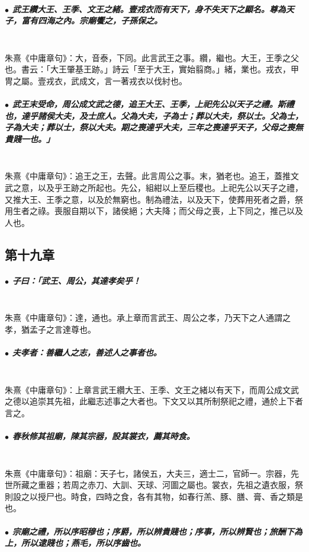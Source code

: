 \documentclass[hyperref, UTF8, 12pt, a4paper]{ctexrep}
\begin{document}
\subparagraph{$\bullet$ 武王纘大王、王季、文王之緒。壹戎衣而有天下，身不失天下之顯名。尊為天子，富有四海之內。宗廟饗之，子孫保之。} ~\\

朱熹《中庸章句》：大，音泰，下同。此言武王之事。纘，繼也。大王，王季之父也。書云：「大王肇基王跡。」詩云「至于大王，實始翦商。」緒，業也。戎衣，甲冑之屬。壹戎衣，武成文，言一著戎衣以伐紂也。

\subparagraph{$\bullet$ 武王末受命，周公成文武之德，追王大王、王季，上祀先公以天子之禮。斯禮也，達乎諸侯大夫，及士庶人。父為大夫，子為士；葬以大夫，祭以士。父為士，子為大夫；葬以士，祭以大夫。期之喪達乎大夫，三年之喪達乎天子，父母之喪無貴賤一也。」} ~\\

朱熹《中庸章句》：追王之王，去聲。此言周公之事。末，猶老也。追王，蓋推文武之意，以及乎王跡之所起也。先公，組紺以上至后稷也。上祀先公以天子之禮，又推大王、王季之意，以及於無窮也。制為禮法，以及天下，使葬用死者之爵，祭用生者之祿。喪服自期以下，諸侯絕；大夫降；而父母之喪，上下同之，推己以及人也。

\newpage
\subsection{第十九章}

\subparagraph{$\bullet$ 子曰：「武王、周公，其達孝矣乎！} ~\\

朱熹《中庸章句》：達，通也。承上章而言武王、周公之孝，乃天下之人通謂之孝，猶孟子之言達尊也。

\subparagraph{$\bullet$ 夫孝者：善繼人之志，善述人之事者也。} ~\\

朱熹《中庸章句》：上章言武王纘大王、王季、文王之緒以有天下，而周公成文武之德以追崇其先祖，此繼志述事之大者也。下文又以其所制祭祀之禮，通於上下者言之。

\subparagraph{$\bullet$ 春秋修其祖廟，陳其宗器，設其裳衣，薦其時食。} ~\\

朱熹《中庸章句》：祖廟：天子七，諸侯五，大夫三，適士二，官師一。宗器，先世所藏之重器；若周之赤刀、大訓、天球、河圖之屬也。裳衣，先祖之遺衣服，祭則設之以授尸也。時食，四時之食，各有其物，如春行羔、豚、膳、膏、香之類是也。

\subparagraph{$\bullet$ 宗廟之禮，所以序昭穆也；序爵，所以辨貴賤也；序事，所以辨賢也；旅酬下為上，所以逮賤也；燕毛，所以序齒也。} ~\\
\end{document}
